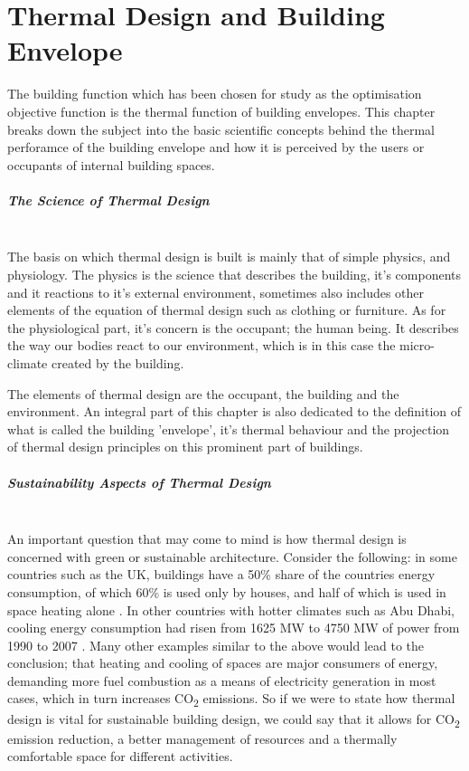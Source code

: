 \chapter{Thermal Design and Building Envelope}

The building function which has been chosen for study as the optimisation objective function is the thermal function of building envelopes. This chapter breaks down the subject into the basic scientific concepts behind the thermal perforamce of the building envelope and how it is perceived by the users or occupants of internal building spaces. 

\paragraph{The Science of Thermal Design}\mbox{}\\

The basis on which thermal design is built is mainly that of simple physics, and physiology. The physics is the science that describes the building, it's components and it reactions to it's external environment, sometimes also includes other elements of the equation of thermal design such as clothing or furniture. As for the physiological part, it's concern is the occupant; the human being. It describes the way our bodies react to our environment, which is in this case the micro-climate created by the building.

The elements of thermal design are the occupant, the building and the environment. An integral part of this chapter is also dedicated to the definition of what is called the building 'envelope', it's thermal behaviour and the projection of thermal design principles on this prominent part of buildings.

\paragraph{Sustainability Aspects of Thermal Design}\mbox{}\\

An important question that may come to mind is how thermal design is concerned with green or sustainable architecture. Consider the following: in some countries such as the UK, buildings have a 50\% share of the countries energy consumption, of which 60\% is used only by houses, and half of which is used in space heating alone \cite{edwards96}. In other countries with hotter climates such as Abu Dhabi, cooling energy consumption had risen from 1625 MW to 4750 MW of power from 1990 to 2007 \cite{nauman07}. Many other examples similar to the above would lead to the conclusion; that heating and cooling of spaces are major consumers of energy, demanding more fuel combustion as a means of electricity generation in most cases, which in turn increases CO\textsubscript{2} emissions. So if we were to state how thermal design is vital for sustainable building design, we could say that it allows for CO\textsubscript{2} emission reduction, a better management of resources and a thermally comfortable space for different activities.

